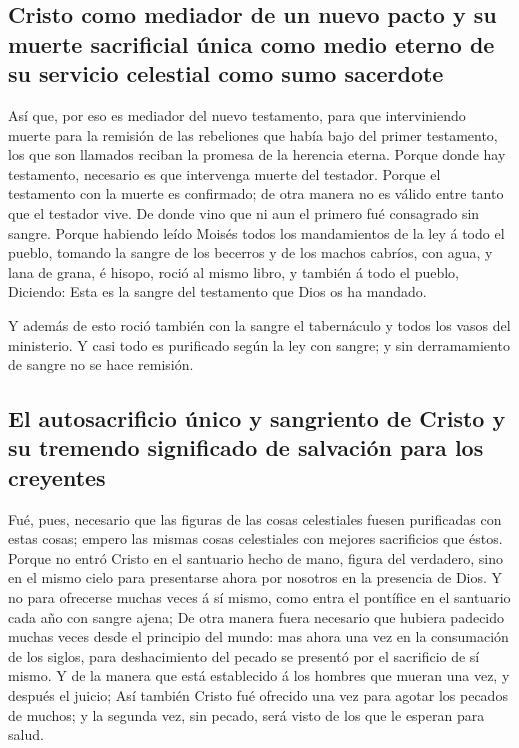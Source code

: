 \hypertarget{cristo-como-mediador-de-un-nuevo-pacto-y-su-muerte-sacrificial-uxfanica-como-medio-eterno-de-su-servicio-celestial-como-sumo-sacerdote}{%
\subsection{Cristo como mediador de un nuevo pacto y su muerte
sacrificial única como medio eterno de su servicio celestial como sumo
sacerdote}\label{cristo-como-mediador-de-un-nuevo-pacto-y-su-muerte-sacrificial-uxfanica-como-medio-eterno-de-su-servicio-celestial-como-sumo-sacerdote}}

 Así que, por eso es mediador del nuevo testamento, para
que interviniendo muerte para la remisión de las rebeliones que había
bajo del primer testamento, los que son llamados reciban la promesa de
la herencia eterna.  Porque donde hay testamento, necesario
es que intervenga muerte del testador.  Porque el
testamento con la muerte es confirmado; de otra manera no es válido
entre tanto que el testador vive.  De donde vino que ni aun
el primero fué consagrado sin sangre.  Porque habiendo
leído Moisés todos los mandamientos de la ley á todo el pueblo, tomando
la sangre de los becerros y de los machos cabríos, con agua, y lana de
grana, é hisopo, roció al mismo libro, y también á todo el pueblo,
 Diciendo: Esta es la sangre del testamento que Dios os ha
mandado.

 Y además de esto roció también con la sangre el
tabernáculo y todos los vasos del ministerio.  Y casi todo
es purificado según la ley con sangre; y sin derramamiento de sangre no
se hace remisión.

\hypertarget{el-autosacrificio-uxfanico-y-sangriento-de-cristo-y-su-tremendo-significado-de-salvaciuxf3n-para-los-creyentes}{%
\subsection{El autosacrificio único y sangriento de Cristo y su tremendo
significado de salvación para los
creyentes}\label{el-autosacrificio-uxfanico-y-sangriento-de-cristo-y-su-tremendo-significado-de-salvaciuxf3n-para-los-creyentes}}

 Fué, pues, necesario que las figuras de las cosas
celestiales fuesen purificadas con estas cosas; empero las mismas cosas
celestiales con mejores sacrificios que éstos.  Porque no
entró Cristo en el santuario hecho de mano, figura del verdadero, sino
en el mismo cielo para presentarse ahora por nosotros en la presencia de
Dios.  Y no para ofrecerse muchas veces á sí mismo, como
entra el pontífice en el santuario cada año con sangre ajena;
 De otra manera fuera necesario que hubiera padecido muchas
veces desde el principio del mundo: mas ahora una vez en la consumación
de los siglos, para deshacimiento del pecado se presentó por el
sacrificio de sí mismo.  Y de la manera que está
establecido á los hombres que mueran una vez, y después el juicio;
 Así también Cristo fué ofrecido una vez para agotar los
pecados de muchos; y la segunda vez, sin pecado, será visto de los que
le esperan para salud.


